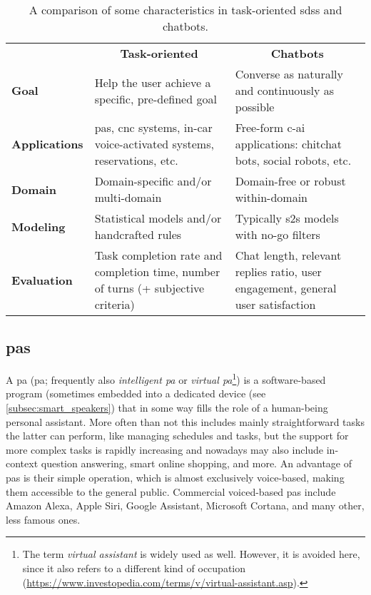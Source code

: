 %
\begin{table}[tb]
	\centering
	\caption[Types of \aclp{sds}: Task-oriented vs.\ Chatbots]{A comparison of some characteristics in task-oriented \acp{sds} and chatbots.}
	\label{tab:sds_types}
	\begin{tabularx}{\linewidth}{>{\bfseries}lp{.38\linewidth}p{.37\linewidth}}
		\toprule
		\vspace{.3cm}
							& \multicolumn{1}{c}{{\large \textbf{Task-oriented}}} & \multicolumn{1}{c}{{\large \textbf{Chatbots}}} \\
		\vspace{.2cm}
		Goal				& Help the user achieve a specific, pre-defined goal
							& Converse as naturally and continuously as possible \\
		\vspace{.2cm}
		Applications		& \Aclp{pa}, \ac{cnc} systems, in-car voice-activated systems, reservations, etc.
							& Free-form \acl{c-ai} applications: chitchat bots, social robots, etc. \\
		\vspace{.2cm}
		Domain				& Domain-specific and/or multi-domain
							& Domain-free or robust within-domain \\
		\vspace{.2cm}
		Modeling			& Statistical models and/or handcrafted rules
							& Typically \ac{s2s} models with no-go filters \\
		\vspace{.2cm}
		Evaluation			& Task completion rate and completion time, number of turns (+ subjective criteria)
							& Chat length, relevant replies ratio, user engagement, general user satisfaction \\
		\bottomrule
	\end{tabularx}
\end{table}
%
\subsection{\Aclp{pa}}
\label{subsec:personal_assistants}

A \acl{pa} (\acs{pa}; frequently also \emph{intelligent \acl{pa}} or \emph{virtual \acl{pa}}\footnote{The term \emph{virtual assistant} is widely used as well. However, it is avoided here, since it also refers to a different kind of occupation (\url{https://www.investopedia.com/terms/v/virtual-assistant.asp}).}) is a software-based program (sometimes embedded into a dedicated device (see \cref{subsec:smart_speakers}) that in some way fills the role of a human-being personal assistant.
More often than not this includes mainly straightforward tasks the latter can perform, like managing schedules and tasks, but the support for more complex tasks is rapidly increasing and nowadays may also include in-context question answering, smart online shopping, and more.
An advantage of \acp{pa} is their simple operation, which is almost exclusively voice-based, making them accessible to the general public.
Commercial voiced-based \acp{pa} include Amazon Alexa, Apple Siri, Google Assistant, Microsoft Cortana, and many other, less famous ones.

